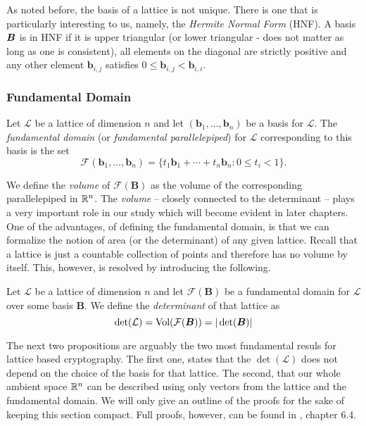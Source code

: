 As noted before, the basis of a lattice is not unique. There is one that is particularly interesting to us, namely, the \textit{Hermite Normal Form} (HNF). A basis $\boldsymbol{B}$ is in HNF if it is upper triangular (or lower triangular - does not matter as long as one is consistent), all elements on the diagonal are strictly positive and any other element $\bm{b}_{i,j}$ satisfies $0 \leq \bm{b}_{i,j} < \bm{b}_{i,i}$.

\subsubsection*{Fundamental Domain}
\begin{definition} \label{fundamental}
    Let $\mathcal{L}$ be a lattice of dimension $n$ and let $(\bm{b}_1, \dots, \bm{b}_n)$ be a basis for $\mathcal{L}$. The \textit{fundamental domain} (or \textit{fundamental parallelepiped}) for $\mathcal{L}$ corresponding to this basis is the set
    $$ \mathcal{F}(\bm{b}_1, \dots, \bm{b}_n) = \{t_1\bm{b}_1 + \cdots + t_n\bm{b}_n : 0 \leq t_i < 1 \}.$$
\end{definition}

We define the \textit{volume} of $\mathcal{F}(\bm{B})$ as the volume of the corresponding parallelepiped in $\mathbb{R}^n$. The \textit{volume} -- closely connected to the determinant -- plays a very important role in our study which will become evident in later chapters. One of the advantages, of defining the fundamental domain, is that we can formalize the notion of area (or the determinant) of any given lattice. Recall that a lattice is just a countable collection of points and therefore has no volume by itself. This, however, is resolved by introducing the following.

\begin{definition}
    Let $\mathcal{L}$ be a lattice of dimension $n$ and let $\mathcal{F}(\bm{B})$ be a fundamental domain for $\mathcal{L}$ over some basis $\bm{B}$. We define the \textit{determinant} of that lattice as
	\[ \det (\mathcal{L}) = \text{Vol}(\mathcal{F(\boldsymbol{B})}) = |\det (\boldsymbol{B}) | \]
\end{definition}

The next two propositions are arguably the two most fundamental resuls for lattice based cryptography. The first one, states that the $\det (\mathcal{L})$ does not depend on the choice of the basis for that lattice. The second, that our whole ambient space $\mathbb{R}^n$ can be described using only vectors from the lattice and the fundamental domain. We will only give an outline of the proofs for the sake of keeping this section compact. Full proofs, however, can be found in \cite{book}, chapter 6.4.

